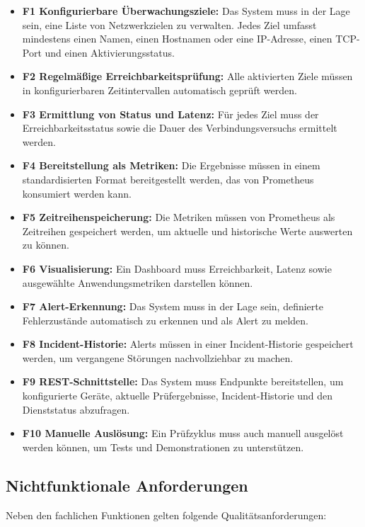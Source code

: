 \begin{itemize}
    \item \textbf{F1 Konfigurierbare Überwachungsziele:} Das System muss in der Lage sein, eine Liste von Netzwerkzielen zu verwalten. Jedes Ziel umfasst mindestens einen Namen, einen Hostnamen oder eine IP-Adresse, einen TCP-Port und einen Aktivierungsstatus.
    \item \textbf{F2 Regelmäßige Erreichbarkeitsprüfung:} Alle aktivierten Ziele müssen in konfigurierbaren Zeitintervallen automatisch geprüft werden.
    \item \textbf{F3 Ermittlung von Status und Latenz:} Für jedes Ziel muss der Erreichbarkeitsstatus sowie die Dauer des Verbindungsversuchs ermittelt werden.
    \item \textbf{F4 Bereitstellung als Metriken:} Die Ergebnisse müssen in einem standardisierten Format bereitgestellt werden, das von Prometheus konsumiert werden kann.
    \item \textbf{F5 Zeitreihenspeicherung:} Die Metriken müssen von Prometheus als Zeitreihen gespeichert werden, um aktuelle und historische Werte auswerten zu können.
    \item \textbf{F6 Visualisierung:} Ein Dashboard muss Erreichbarkeit, Latenz sowie ausgewählte Anwendungsmetriken darstellen können.
    \item \textbf{F7 Alert-Erkennung:} Das System muss in der Lage sein, definierte Fehlerzustände automatisch zu erkennen und als Alert zu melden.
    \item \textbf{F8 Incident-Historie:} Alerts müssen in einer Incident-Historie gespeichert werden, um vergangene Störungen nachvollziehbar zu machen.
    \item \textbf{F9 REST-Schnittstelle:} Das System muss Endpunkte bereitstellen, um konfigurierte Geräte, aktuelle Prüfergebnisse, Incident-Historie und den Dienststatus abzufragen.
    \item \textbf{F10 Manuelle Auslösung:} Ein Prüfzyklus muss auch manuell ausgelöst werden können, um Tests und Demonstrationen zu unterstützen.
\end{itemize}

\subsection{Nichtfunktionale Anforderungen}
\label{subsec:nichtfunktionale-anforderungen}

Neben den fachlichen Funktionen gelten folgende Qualitätsanforderungen:

